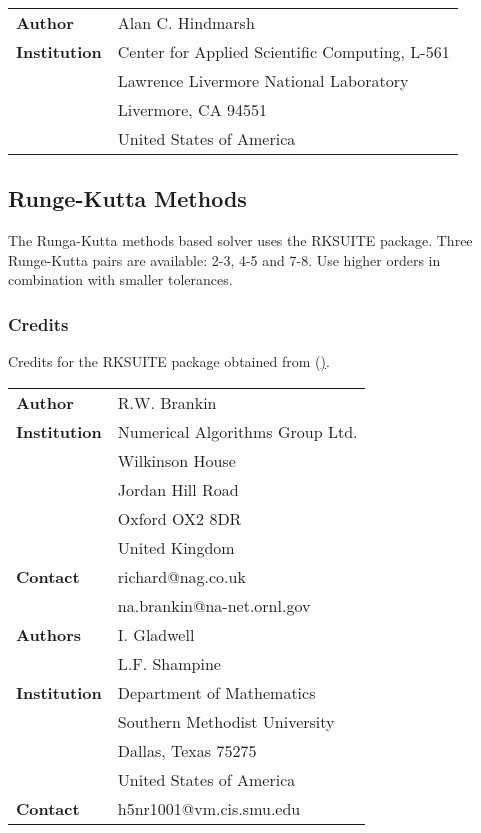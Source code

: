 \vspace{0.5cm}
\begin{tabular}{ l l }
 \textbf{Author}      & Alan C. Hindmarsh \\
 \textbf{Institution} & Center for Applied Scientific Computing, L-561 \\
                      & Lawrence Livermore National Laboratory \\
                      & Livermore, CA 94551 \\
                      & United States of America \\
\end{tabular}

\subsection{Runge-Kutta Methods}
\label{subsec:RKSUITE}
The Runga-Kutta methods based solver uses the RKSUITE package. Three Runge-Kutta pairs are available: 2-3, 4-5 and 7-8. Use higher orders in combination with smaller tolerances.
\subsubsection{Credits}
Credits for the RKSUITE package obtained from (\hyperlink{http://www.netlib.org/}).

\vspace{0.5cm}
\begin{tabular}{ l l }
 \textbf{Author}      & R.W. Brankin \\
 \textbf{Institution} & Numerical Algorithms Group Ltd. \\
                      & Wilkinson House \\
                      & Jordan Hill Road \\
                      & Oxford OX2 8DR \\
                      & United Kingdom \\
 \textbf{Contact}     & richard@nag.co.uk \\
                      & na.brankin@na-net.ornl.gov \\
 \textbf{Authors}     & I. Gladwell \\
                      & L.F. Shampine \\
 \textbf{Institution} & Department of Mathematics \\
                      & Southern Methodist University \\
                      & Dallas, Texas 75275 \\
                      & United States of America \\
 \textbf{Contact}     & h5nr1001@vm.cis.smu.edu \\
\end{tabular}
